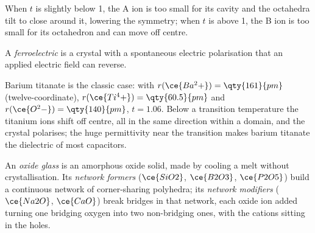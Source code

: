 When $t$ is slightly below 1, the A ion is too small for its cavity and the
octahedra tilt to close around it, lowering the symmetry; when $t$ is above 1,
the B ion is too small for its octahedron and can move off centre.

\begin{definition}[Ferroelectric]\label{def:b3:inorganic-materials:ferroelectric}
A \emph{ferroelectric} is a crystal with a spontaneous
electric polarisation that an applied electric field can reverse.
\end{definition}

Barium titanate is the classic case: with $r(\ce{Ba^2+}) = \qty{161}{pm}$ (twelve-coordinate),
$r(\ce{Ti^4+}) = \qty{60.5}{pm}$ and $r(\ce{O^2-}) = \qty{140}{pm}$, $t = 1.06$. Below a transition temperature the
titanium ions shift off centre, all in the same direction within a domain,
and the crystal polarises; the huge permittivity near the transition makes
barium titanate the dielectric of most  capacitors.

\begin{definition}\label{def:b3:inorganic-materials:glass}
An \emph{oxide glass} is an amorphous oxide solid, made by
cooling a melt without crystallisation. Its \emph{network
formers} ($\ce{SiO2}$, $\ce{B2O3}$, $\ce{P2O5}$) build a continuous network of
corner-sharing polyhedra; its \emph{network modifiers}
($\ce{Na2O}$, $\ce{CaO}$) break bridges in that network, each oxide ion added turning one
bridging oxygen into two non-bridging ones, with the cations sitting in the
holes.
\end{definition}

